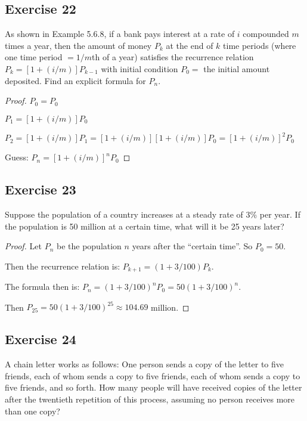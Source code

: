 \documentclass[14pt]{extarticle}
\begin{document}
    \subsection{Exercise 22}
    As shown in Example 5.6.8, if a bank pays interest at a rate of $i$ compounded $m$ times a year, then the amount of
    money $P_k$ at the end of $k$ time periods (where one time period \(= 1/m\)th of a year) satisfies the recurrence
    relation \(P_k = [1 + (i/m)] P_{k-1}\) with initial condition \(P_0 =\) the initial amount deposited.
    Find an explicit formula for $P_n$.

    \begin{proof}
        \(P_0 = P_0\)

        \(P_1 = [1 + (i/m)] P_0\)

        \(P_2 = [1 + (i/m)] P_1 = [1 + (i/m)][1 + (i/m)] P_0 = [1 + (i/m)]^2 P_0\)

        Guess: \(P_n = [1 + (i/m)]^n P_0\)
    \end{proof}

    \subsection{Exercise 23}
    Suppose the population of a country increases at a steady rate of 3\% per year. If the population is 50 million at a
    certain time, what will it be 25 years later?

    \begin{proof}
        Let $P_n$ be the population $n$ years after the ``certain time''. So $P_0 = 50$.

        Then the recurrence relation is: \(P_{k+1} = (1 + 3/100) P_k\).

        The formula then is: \(P_n = (1 + 3/100)^n P_0 = 50(1+3/100)^n\).

        Then \(P_{25} = 50(1+3/100)^{25} \approx 104.69\) million.
    \end{proof}

    \subsection{Exercise 24}
    A chain letter works as follows: One person sends a copy of the letter to five friends, each of whom sends a copy to
    five friends, each of whom sends a copy to five friends, and so forth. How many people will have received copies of
    the letter after the twentieth repetition of this process, assuming no person receives more than one copy?
\end{document}
